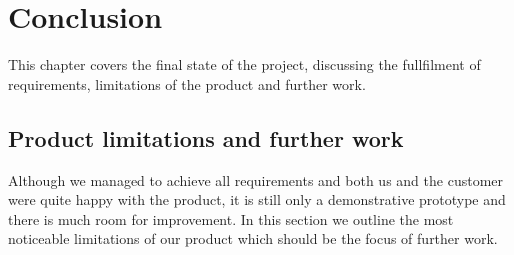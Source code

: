 \chapter{Conclusion}
\label{ch:conclusion}

This chapter covers the final state of the project, discussing the fullfilment
of requirements, limitations of the product and further work.

\section{Product limitations and further work}
Although we managed to achieve all requirements and both us and the customer were quite happy
with the product, it is still only a demonstrative prototype and there is much room for improvement.
In this section we outline the most noticeable limitations of our product which should be
the focus of further work.

